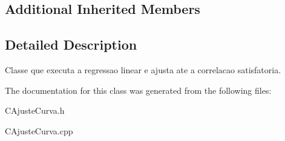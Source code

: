 \subsection*{Additional Inherited Members}


\subsection{Detailed Description}
Classe que executa a regressao linear e ajusta ate a correlacao satisfatoria. 

The documentation for this class was generated from the following files\-:\begin{DoxyCompactItemize}
\item 
C\-Ajuste\-Curva.\-h\item 
C\-Ajuste\-Curva.\-cpp\end{DoxyCompactItemize}
